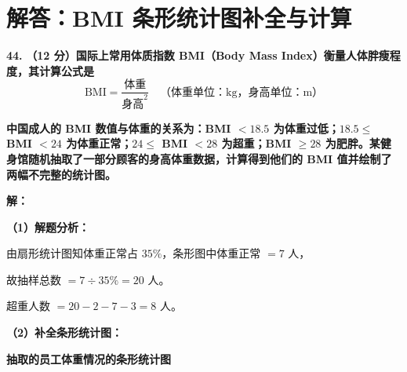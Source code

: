\newpage



\section{解答：BMI 条形统计图补全与计算}

\vspace{0.6cm}

\textbf{\LARGE 44.} \textbf{（12 分）国际上常用体质指数 BMI（Body Mass Index）衡量人体胖瘦程度，其计算公式是}
$$\text{BMI} = \frac{\text{体重}}{\text{身高}^2} \quad \text{（体重单位：kg，身高单位：m）}$$

\textbf{中国成人的 BMI 数值与体重的关系为：BMI $< 18.5$ 为体重过低；$18.5 \leqslant$ BMI $< 24$ 为体重正常；$24 \leqslant$ BMI $< 28$ 为超重；BMI $\geqslant 28$ 为肥胖。某健身馆随机抽取了一部分顾客的身高体重数据，计算得到他们的 BMI 值并绘制了两幅不完整的统计图。}

\vspace{0.4cm}
\textbf{解：}

\textbf{（1）解题分析：}

由扇形统计图知体重正常占 $35\%$，条形图中体重正常 $= 7$ 人，

故抽样总数 $= 7 \div 35\% = 20$ 人。

超重人数 $= 20 - 2 - 7 - 3 = 8$ 人。

\vspace{0.2cm}
\textbf{（2）补全条形统计图：}

\begin{center}
{\textbf{抽取的员工体重情况的条形统计图}}
\end{center}

